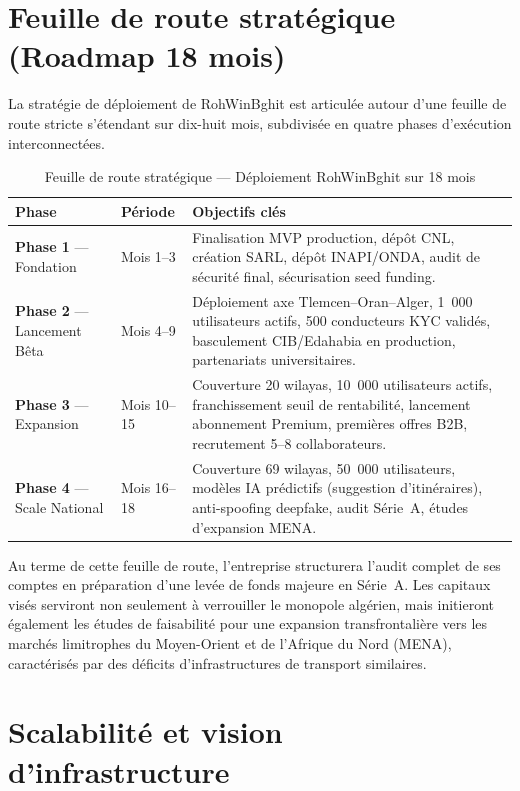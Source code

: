 \section{Feuille de route stratégique (Roadmap 18 mois)}
\label{sec:roadmap}

La stratégie de déploiement de RohWinBghit est articulée autour d'une feuille de route stricte s'étendant sur dix-huit mois, subdivisée en quatre phases d'exécution interconnectées.

\begin{table}[H]
\centering
\footnotesize
\begin{tabularx}{\textwidth}{|l|l|X|}
\hline
\rowcolor{rohlight}
\textbf{Phase} & \textbf{Période} & \textbf{Objectifs clés} \\
\hline
\textbf{Phase 1} --- Fondation & Mois 1--3 & Finalisation MVP production, dépôt CNL, création SARL, dépôt INAPI/ONDA, audit de sécurité final, sécurisation seed funding. \\
\hline
\textbf{Phase 2} --- Lancement Bêta & Mois 4--9 & Déploiement axe Tlemcen--Oran--Alger, 1~000 utilisateurs actifs, 500 conducteurs KYC validés, basculement CIB/Edahabia en production, partenariats universitaires. \\
\hline
\textbf{Phase 3} --- Expansion & Mois 10--15 & Couverture 20 wilayas, 10~000 utilisateurs actifs, franchissement seuil de rentabilité, lancement abonnement Premium, premières offres B2B, recrutement 5--8 collaborateurs. \\
\hline
\textbf{Phase 4} --- Scale National & Mois 16--18 & Couverture 69 wilayas, 50~000 utilisateurs, modèles IA prédictifs (suggestion d'itinéraires), anti-spoofing deepfake, audit Série~A, études d'expansion MENA. \\
\hline
\end{tabularx}
  \caption{Feuille de route stratégique --- Déploiement RohWinBghit sur 18 mois}
  \label{tab:roadmap}
\end{table}

Au terme de cette feuille de route, l'entreprise structurera l'audit complet de ses comptes en préparation d'une levée de fonds majeure en Série~A. Les capitaux visés serviront non seulement à verrouiller le monopole algérien, mais initieront également les études de faisabilité pour une expansion transfrontalière vers les marchés limitrophes du Moyen-Orient et de l'Afrique du Nord (MENA), caractérisés par des déficits d'infrastructures de transport similaires.

\section{Scalabilité et vision d'infrastructure}
\label{sec:scalabilite}

